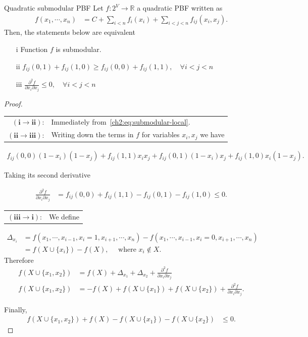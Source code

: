 \begin{proposition}{Quadratic submodular PBF}
	Let $f:2^V\rightarrow \mathbb{R}$ a quadratic PBF  written as
	\begin{align*}
		f(x_1,\cdots,x_n) &= C + \sum_{i<n}{f_{i}(x_i)} + \sum_{i<j<n}{f_{ij}(x_i,x_j)}.
	\end{align*}
	Then, the statements below are equivalent
	\begin{itemize}
	 	\item[i]{Function $f$ is submodular.}
		\item[ii]{ $f_{ij}(0,1) + f_{ij}(1,0) \geq f_{ij}(0,0) + f_{ij}(1,1), \quad \forall i<j<n$}
		\item[iii]{ $\frac{\partial^2 f}{\partial x_i\partial x_j} \leq 0, \quad \forall i<j<n$ }
	\end{itemize}
	\begin{proof}
	
	\begin{tabular}{rl}
	$\mathbf{(i\rightarrow ii)}$:& Immediately from~\cref{ch2:eq:submodular-local}. \\	
	$\mathbf{(ii\rightarrow iii)}$:&  Writing down the terms in $f$ for variables $x_i,x_j$ we have
	\end{tabular}
	
	\begin{align*}
		f_{ij}(0,0)(1-x_i)(1-x_j) + f_{ij}(1,1)x_ix_j + f_{ij}(0,1)(1-x_i)x_j + f_{ij}(1,0)x_i(1-x_j).
	\end{align*}

	Taking its second derivative

	\begin{align*}
		\frac{\partial^2f}{\partial x_i\partial x_j} &= f_{ij}(0,0) + f_{ij}(1,1) - f_{ij}(0,1) - f_{ij}(1,0) \leq 0.
	\end{align*}
	
	\begin{tabular}{rl}
		$\mathbf{(iii\rightarrow i)}$:& We define
	\end{tabular}		
	
		\begin{align*}
			\Delta_{x_i} &= f(x_1,\cdots,x_{i-1},x_i=1,x_{i+1},\cdots,x_n) - f(x_1,\cdots,x_{i-1},x_i=0,x_{i+1},\cdots,x_n) \\
			&= f(X \cup \{x_i\}) - f(X), \quad \text{ where } x_i \notin X.
		\end{align*}		 		
		Therefore
		\begin{align*}
			f( X \cup \{x_1,x_2\}) &= f(X) + \Delta_{x_1} + \Delta_{x_2} + \frac{ \partial^2 f}{\partial x_i \partial x_j} \\
			f( X \cup \{x_1,x_2\}) &= -f(X) + f(X \cup \{x_1\}) + f(X \cup \{x_2\}) + \frac{ \partial^2 f}{\partial x_i \partial x_j}.
		\end{align*}	
		
		Finally,
		\begin{align*}
			f( X \cup \{x_1,x_2\}) +f(X) - f(X \cup \{x_1\}) - f(X \cup \{x_2\}) &\leq 0.	
		\end{align*}
		
	\end{proof}
\end{proposition}

